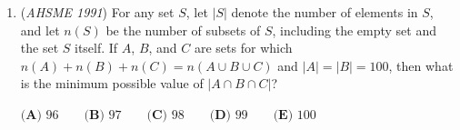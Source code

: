\begin{enumerate}
 $\textbf{(A) } \frac{8}{5} \qquad \textbf{(B) } \frac{7}{20}\sqrt{21} \qquad \textbf{(C) } \frac{1+\sqrt{5}}{2} \qquad \textbf{(D) } \frac{13}{8} \qquad \textbf{(E) } \sqrt{3}$


	\item (\textit{AHSME 1991}) For any set $S$, let $|S|$ denote the number of elements in $S$, and let $n(S)$ be the number of subsets of $S$, including the empty set and the set $S$ itself. If $A$, $B$, and $C$ are sets for which $n(A)+n(B)+n(C)=n(A\cup B\cup C)$ and $|A|=|B|=100$, then what is the minimum possible value of $|A\cap B\cap C|$?


 $\textbf{(A) } 96 \qquad \textbf{(B) } 97 \qquad \textbf{(C) } 98 \qquad \textbf{(D) } 99 \qquad \textbf{(E) } 100$


\end{enumerate}